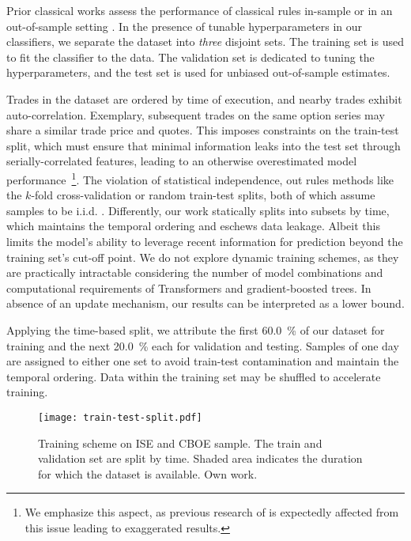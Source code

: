 Prior classical works assess the performance of classical rules in-sample \autocite[cp.][541]{ellisAccuracyTradeClassification2000} or in an out-of-sample setting \autocites[cp.][7--9]{grauerOptionTradeClassification2022}[][3814--3815]{chakrabartyTradeClassificationAlgorithms2007}.  In the presence of tunable hyperparameters in our classifiers, we separate the dataset into \emph{three} disjoint sets. The training set is used to fit the classifier to the data. The validation set is dedicated to tuning the hyperparameters, and the test set is used for unbiased out-of-sample estimates.

Trades in the dataset are ordered by time of execution, and nearby trades exhibit auto-correlation. Exemplary, subsequent trades on the same option series may share a similar trade price and quotes. This imposes constraints on the train-test split, which must ensure that minimal information leaks into the test set through serially-correlated features, leading to an otherwise overestimated model performance~\footnote{We emphasize this aspect, as previous research of \textcite[][14]{ronenMachineLearningTrade2022} is expectedly affected from this issue leading to exaggerated results.}. The violation of statistical independence, out rules methods like the $k$-fold cross-validation or random train-test splits, both of which assume samples to be i.i.d. \autocite[][103--105]{lopezdepradoAdvancesFinancialMachine2018}. Differently, our work statically splits into subsets by time, which maintains the temporal ordering and eschews data leakage. Albeit this limits the model's ability to leverage recent information for prediction beyond the training set's cut-off point. We do not explore dynamic training schemes, as they are practically intractable considering the number of model combinations and computational requirements of Transformers and gradient-boosted trees. In absence of an update mechanism, our results can be interpreted as a lower bound.

Applying the time-based split, we attribute the first \SI{60.0}{\percent} of our dataset for training and the next \SI{20.0}{\percent} each for validation and testing. Samples of one day are assigned to either one set to avoid train-test contamination and maintain the temporal ordering. Data within the training set may be shuffled to accelerate training.

\begin{figure}[ht]
    \centering
    \texttt{[image: train-test-split.pdf]}
    \caption[Training Schemes]{Training scheme on \gls{ISE} and \gls{CBOE} sample. The train and validation set are split by time. Shaded area  indicates the duration for which the dataset is available. Own work.}
    \label{fig:train-test-split}
\end{figure}

